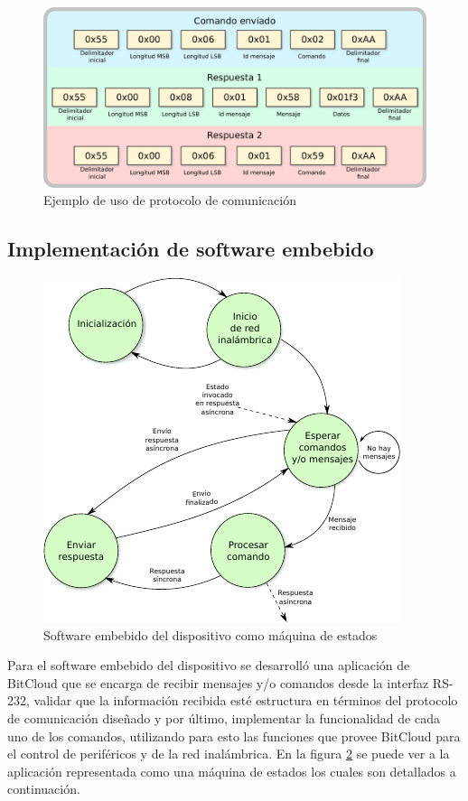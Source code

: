  
\begin{figure}
	\centering
	\includegraphics[scale=0.4]{capitulo_3_imgs/protocolo_ejemplo_1.pdf}
	\caption{Ejemplo de uso de protocolo de comunicación}
	\label{fig:protocolo_ejemplo}
\end{figure}

\subsection{Implementación de software embebido}

\begin{figure}
	\centering
	\includegraphics[scale=1.2]{capitulo_3_imgs/app_sd.pdf}
	\caption{Software embebido del dispositivo como máquina de estados}
	\label{fig:maquina_estados_sd}
\end{figure}

Para el software embebido del dispositivo se desarrolló una aplicación de BitCloud que se encarga de recibir mensajes y/o comandos desde la interfaz RS-232, validar que la información recibida esté estructura en términos del protocolo de comunicación diseñado y por último, implementar la funcionalidad de cada uno de los comandos, utilizando para esto las funciones que provee BitCloud para el control de periféricos y de la red inalámbrica. En la figura \ref{fig:maquina_estados_sd} se puede ver a la aplicación representada como una máquina de estados los cuales son detallados a continuación. 

